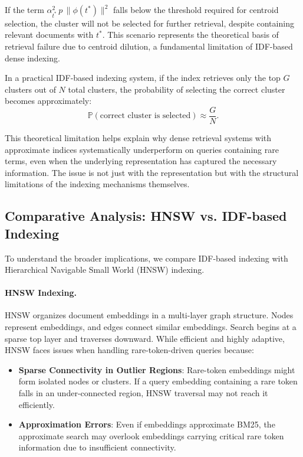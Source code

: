 \documentclass[sigconf,review]{acmart}
\begin{document}
If the term $\alpha_{t^*}^2 \, p \, \|\phi(t^*)\|^2$ falls below the threshold required for centroid selection, the cluster will not be selected for further retrieval, despite containing relevant documents with $t^*$. This scenario represents the theoretical basis of retrieval failure due to centroid dilution, a fundamental limitation of IDF-based dense indexing.

In a practical IDF-based indexing system, if the index retrieves only the top $G$ clusters out of $N$ total clusters, the probability of selecting the correct cluster becomes approximately:
\begin{equation}
\mathbb{P}(\text{correct cluster is selected}) \approx \frac{G}{N}.
\end{equation}

This theoretical limitation helps explain why dense retrieval systems with approximate indices systematically underperform on queries containing rare terms, even when the underlying representation has captured the necessary information. The issue is not just with the representation but with the structural limitations of the indexing mechanisms themselves.

\subsection{Comparative Analysis: HNSW vs. IDF-based Indexing}

To understand the broader implications, we compare IDF-based indexing with Hierarchical Navigable Small World (HNSW) indexing.

\paragraph{HNSW Indexing.}
HNSW organizes document embeddings in a multi-layer graph structure. Nodes represent embeddings, and edges connect similar embeddings. Search begins at a sparse top layer and traverses downward. While efficient and highly adaptive, HNSW faces issues when handling rare-token-driven queries because:

\begin{itemize}
  \item \textbf{Sparse Connectivity in Outlier Regions}: Rare-token embeddings might form isolated nodes or clusters. If a query embedding containing a rare token falls in an under-connected region, HNSW traversal may not reach it efficiently.
  \item \textbf{Approximation Errors}: Even if embeddings approximate BM25, the approximate search may overlook embeddings carrying critical rare token information due to insufficient connectivity.
\end{itemize}
\end{document}
